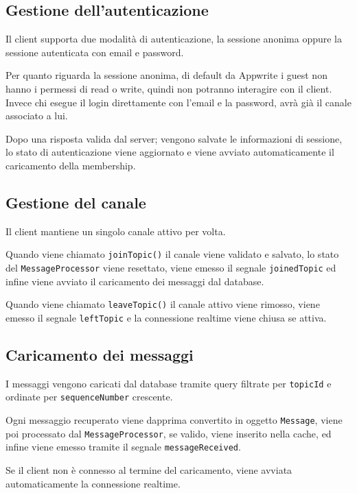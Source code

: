 \documentclass[a4paper, 11pt, twoside]{report}
\begin{document}
\subsection{Gestione dell’autenticazione}

Il client supporta due modalità di autenticazione, la sessione anonima oppure la sessione autenticata con email e password.

Per quanto riguarda la sessione anonima, di default da Appwrite i guest non hanno i permessi di read o write, quindi non potranno interagire con il client. Invece chi esegue il login direttamente con l'email e la password, avrà già il canale associato a lui.

Dopo una risposta valida dal server; vengono salvate le informazioni di sessione, lo stato di autenticazione viene aggiornato
e viene avviato automaticamente il caricamento della membership.

\subsection{Gestione del canale}

Il client mantiene un singolo canale attivo per volta.

Quando viene chiamato \texttt{joinTopic()} il canale viene validato e salvato, lo stato del \texttt{MessageProcessor} viene
resettato, viene emesso il segnale \texttt{joinedTopic} ed infine viene avviato il caricamento dei messaggi dal database.

Quando viene chiamato \texttt{leaveTopic()} il canale attivo viene rimosso, viene emesso il segnale \texttt{leftTopic} e la
connessione realtime viene chiusa se attiva.

\subsection{Caricamento dei messaggi}

I messaggi vengono caricati dal database tramite query filtrate per \texttt{topicId} e ordinate per \texttt{sequenceNumber} crescente.

Ogni messaggio recuperato viene dapprima convertito in oggetto \texttt{Message}, viene poi processato dal 
\texttt{MessageProcessor}, se valido, viene inserito nella cache, ed infine viene emesso tramite il segnale
\texttt{messageReceived}.

Se il client non è connesso al termine del caricamento, viene avviata automaticamente la connessione realtime.
\end{document}
